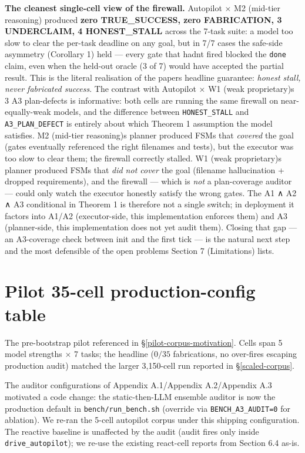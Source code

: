 \textbf{The cleanest single-cell view of the firewall.} Autopilot × M2 (mid-tier reasoning) produced
\textbf{zero TRUE\_SUCCESS, zero FABRICATION, 3 UNDERCLAIM, 4 HONEST\_STALL} across the 7-task suite:
a model too slow to clear the per-task deadline on any goal, but in 7/7 cases the safe-side
asymmetry (Corollary 1) held --- every gate that hadn\textquotesingle t fired blocked the \texttt{done} claim, even
when the held-out oracle (3 of 7) would have accepted the partial result. This is the literal
realisation of the paper\textquotesingle s headline guarantee: \emph{honest stall, never fabricated success}.
The contrast with Autopilot × W1 (weak proprietary)\textquotesingle s 3 A3 plan-defects is informative: both cells
are running the same firewall on near-equally-weak models, and the difference between
\texttt{HONEST\_STALL} and \texttt{A3\_PLAN\_DEFECT} is entirely about which Theorem 1 assumption the model
satisfies. M2 (mid-tier reasoning)\textquotesingle s planner produced FSMs that \emph{covered} the goal (gates eventually
referenced the right filenames and tests), but the executor was too slow to clear them; the
firewall correctly stalled. W1 (weak proprietary)\textquotesingle s planner produced FSMs that \emph{did not cover} the
goal (filename hallucination + dropped requirements), and the firewall --- which is \emph{not} a
plan-coverage auditor --- could only watch the executor honestly satisfy the wrong gates. The
A1 ∧ A2 ∧ A3 conditional in Theorem 1 is therefore not a single switch; in deployment it
factors into A1/A2 (executor-side, this implementation enforces them) and A3 (planner-side,
this implementation does not yet audit them). Closing that gap --- an A3-coverage check between
init and the first tick --- is the natural next step and the most defensible of the open
problems Section 7 (Limitations) lists.


\section{Pilot 35-cell production-config table}\label{app:pilot}

The pre-bootstrap pilot referenced in \S\ref{pilot-corpus-motivation}. Cells span 5 model
strengths $\times$ 7 tasks; the headline ($0/35$ fabrications, no over-fires escaping
production audit) matched the larger 3{,}150-cell run reported in \S\ref{scaled-corpus}.



The auditor configurations of Appendix A.1/Appendix A.2/Appendix A.3 motivated a code change: the static-then-LLM
ensemble auditor is now the production default in \texttt{bench/run\_bench.sh} (override via
\texttt{BENCH\_A3\_AUDIT=0} for ablation). We re-ran the 5-cell autopilot corpus under this
shipping configuration. The reactive baseline is unaffected by the audit (audit fires only
inside \texttt{drive\_autopilot}); we re-use the existing react-cell reports from Section 6.4 as-is.

